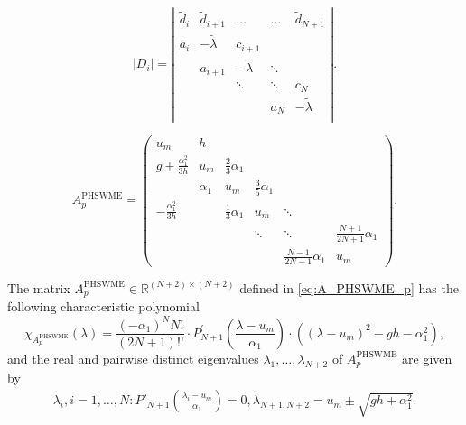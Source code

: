 \documentclass[10pt,a4paper]{amsart}
\begin{document}
    \begin{equation}\label{subdeterminant_D}
        \left|D_i\right| = \left|
        \begin{array}{ccccc}
            \widetilde{d}_{i} & \widetilde{d}_{i+1} & \dots & \dots & \widetilde{d}_{N+1}\\
            a_i &  -\widetilde{\lambda} & c_{i+1}  &  & \\
            & a_{i+1} & -\widetilde{\lambda} & \ddots &\\
            & & \ddots & \ddots & c_N \\
            & &   & a_N & -\widetilde{\lambda}   \\
        \end{array}
        \right|.
    \end{equation}

    \begin{equation}\label{eq:A_PHSWME_p}
        A^{\textrm{PHSWME}}_{p} =
        \left(\begin{array}{cccccc}
        u_m & h &  &  &  &  \\
        g + \frac{\alpha_1^2}{3 h} & u_m & \frac{2}{3} \alpha_1 &  &  &  \\
         & \alpha_1 & u_m & \frac{3}{5} \alpha_1 & &\\
        -\frac{\alpha_1^2}{3h} &   & \frac{1}{3}\alpha_1 & u_m & \ddots & \\
         &  &  & \ddots & \ddots & \frac{N+1}{2N+1}\alpha_1 \\
         &  &  &  & \frac{N-1}{2N-1}\alpha_1 & u_m
        \end{array}\right).
    \end{equation}

\begin{theorem}\label{th:APHSWME_p_chi}
    The matrix $A^{\textrm{PHSWME}}_{p} \in \mathbb{R}^{(N+2)\times(N+2)}$ defined in \eqref{eq:A_PHSWME_p} has the following characteristic polynomial
    \begin{equation}\label{eq:APHSWME_p_char_poly}
        \chi_{A^{\textrm{PHSWME}}_{p}}(\lambda) = \frac{(-\alpha_1)^NN!}{(2N+1)!!} \cdot P^{'}_{N+1}\left(\frac{\lambda -u_m}{\alpha_1}\right) \cdot \left( \left( \lambda - u_m \right)^2 - gh - \alpha_1^2 \right),
    \end{equation}
    and the real and pairwise distinct eigenvalues $\lambda_1, \ldots, \lambda_{N+2}$ of $A^{\textrm{PHSWME}}_{p}$ are given by
    \begin{eqnarray}\label{eq:APHSWME_p_EV}
        \lambda_i, i=1,\ldots, N: P'_{N+1}\left(\frac{\lambda_i - u_m}{\alpha_1}\right)=0,
        \lambda_{N+1,N+2} = u_m \pm \sqrt{gh + \alpha_1^2}.
    \end{eqnarray}
\end{theorem}
\end{document}

